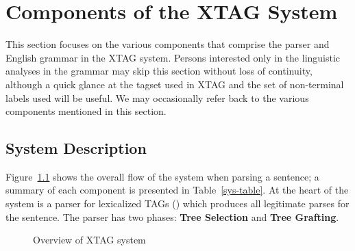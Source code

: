 \chapter{Components of the XTAG System}
\label{overview}

This section focuses on the various components that comprise the
parser and English grammar in the XTAG system.  Persons interested
only in the linguistic analyses in the grammar may skip this section
without loss of continuity, although a quick glance at the tagset used
in XTAG and the set of non-terminal labels used will be useful. We may
occasionally refer back to the various components mentioned in this
section.

\section{System Description}

Figure~{\ref{flowchart}} shows the overall flow of the system when
parsing a sentence; a summary of each component is presented in
Table~\ref{sys-table}. At the heart of the system is a parser for
lexicalized TAGs (\cite{schabesjoshi88,schabes90}) which produces all
legitimate parses for the sentence. The parser has two phases: {\bf
Tree Selection} and {\bf Tree Grafting}.

\begin{figure}[t]
\hspace{0.35in}
\centering
{}
\caption[XTAG system diagram]{Overview of XTAG system }
\label{flowchart}
\end{figure}

